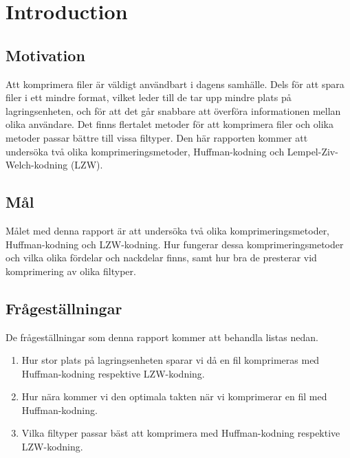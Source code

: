 

\chapter{Introduction}
\label{cha:introduction}
\section{Motivation}
\label{sec:motivation}
Att komprimera filer är väldigt användbart i dagens samhälle. Dels för att spara filer i ett mindre format, vilket leder till de tar upp mindre plats på lagringsenheten, och för att det går snabbare att överföra informationen mellan olika användare. Det finns flertalet metoder för att komprimera filer och olika metoder passar bättre till vissa filtyper. Den här rapporten kommer att undersöka två olika komprimeringsmetoder, Huffman-kodning och Lempel-Ziv-Welch-kodning (LZW).

\section{Mål}
\label{sec:aim}

Målet med denna rapport är att undersöka två olika komprimeringsmetoder, Huffman-kodning och LZW-kodning. Hur fungerar dessa komprimeringsmetoder och vilka olika fördelar och nackdelar finns, samt hur bra de presterar vid komprimering av olika filtyper.

\section{Frågeställningar}
\label{sec:research-questions}

De frågeställningar som denna rapport kommer att behandla listas nedan.

\begin{enumerate}
\item Hur stor plats på lagringsenheten sparar vi då en fil komprimeras med Huffman-kodning respektive LZW-kodning.

\item Hur nära kommer vi den optimala takten när vi komprimerar en fil med Huffman-kodning.

\item Vilka filtyper passar bäst att komprimera med Huffman-kodning respektive LZW-kodning.

\end{enumerate}


